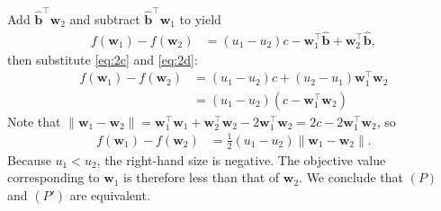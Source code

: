 \documentclass[journal,twoside]{IEEEtran}
\begin{document}
Add $\hat{\mathbf{b}}^\top \mathbf{w}_2$ and subtract $\hat{\mathbf{b}}^\top \mathbf{w}_1$ to yield
\begin{align*}
f(\mathbf{w}_1) - f(\mathbf{w}_2) &= (u_1 - u_2)c - \mathbf{w}_1^\top \hat{\mathbf{b}} + \mathbf{w}_2^\top \hat{\mathbf{b}},
\end{align*}
then substitute \eqref{eq:2c} and \eqref{eq:2d}:
\begin{align*}
f(\mathbf{w}_1) - f(\mathbf{w}_2) &= (u_1 - u_2)c + (u_2 - u_1) \mathbf{w}_1^\top \mathbf{w}_2 \\
&=  (u_1 - u_2)(c - \mathbf{w}_1^\top \mathbf{w}_2)
\end{align*}
Note that $\lVert \mathbf{w}_1 - \mathbf{w}_2 \rVert = \mathbf{w}_1^\top \mathbf{w}_1 + \mathbf{w}_2^\top \mathbf{w}_2 - 2\mathbf{w}_1^\top \mathbf{w}_2 = 2c - 2\mathbf{w}_1^\top \mathbf{w}_2$, so
\begin{align*}
f(\mathbf{w}_1) - f(\mathbf{w}_2) &= \frac{1}{2}(u_1 - u_2)\lVert \mathbf{w}_1 - \mathbf{w}_2 \rVert.
\end{align*}
Because $u_1 < u_2$, the right-hand size is negative. The objective value corresponding to $\mathbf{w}_1$ is therefore less than that of $\mathbf{w}_2$. We conclude that $(P)$ and $(P')$ are equivalent.




\end{document}
